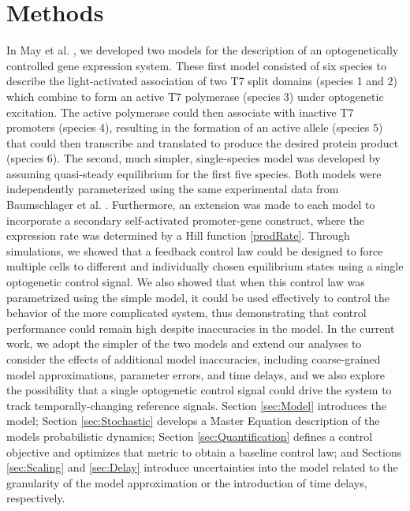 \documentclass[12pt]{iopart}
\begin{document}
\section{Methods}
In May et al. \cite{May2021}, we developed two models for the description of an optogenetically controlled gene expression system.
These first model consisted of six species to describe the light-activated association of two T7 split domains (species 1 and 2) which combine to form an active T7 polymerase (species 3) under optogenetic excitation. 
The active polymerase could then associate with inactive T7 promoters (species 4), resulting in the formation of an active allele (species 5) that could then transcribe and translated to produce the desired protein product (species 6). 
The second, much simpler, single-species model was developed by assuming quasi-steady equilibrium for the first five species. 
Both models were independently parameterized using the same experimental data from Baumschlager et al. \cite{Baumschlager2017}. 
Furthermore, an extension was made to each model to incorporate a secondary self-activated promoter-gene construct, where the expression rate was determined by a Hill function \ref{prodRate}.
Through simulations, we showed that a feedback control law could be designed to force multiple cells to different and individually chosen equilibrium states using a single optogenetic control signal. 
We also showed that when this control law was parametrized using the simple model, it could be used effectively to control the behavior of the more complicated system, thus demonstrating that control performance could remain high despite inaccuracies in the model.
In the current work, we adopt the simpler of the two models and extend our analyses to consider the effects of additional model inaccuracies, including coarse-grained model approximations, parameter errors, and time delays, and we also explore the possibility that a single optogenetic control signal could drive the system to track temporally-changing reference signals.
Section \ref{sec:Model} introduces the model; Section \ref{sec:Stochastic} develops a Master Equation description of the models probabilistic dynamics; Section \ref{sec:Quantification} defines a control objective and optimizes that metric to obtain a baseline control law; and Sections \ref{sec:Scaling} and \ref{sec:Delay} introduce uncertainties into the model related to the granularity of the model approximation or the introduction of time delays, respectively. 
\end{document}

